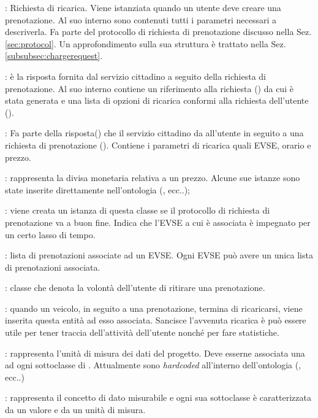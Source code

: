 \begin{description}
	\item {}: Richiesta di ricarica. Viene istanziata quando un utente deve creare una prenotazione. Al suo interno sono contenuti tutti i parametri necessari a descriverla. Fa parte del protocollo di richiesta di prenotazione discusso nella Sez. \ref{sec:protocol}. Un approfondimento sulla sua struttura è trattato nella Sez. \ref{subsubsec:chargerequest}.
	\item {}: è la risposta fornita dal servizio cittadino a seguito della richiesta di prenotazione. Al suo interno contiene un riferimento alla richiesta () da cui è stata generata e una lista di opzioni di ricarica conformi alla richiesta dell'utente ().
	\item {}: Fa parte della risposta() che il servizio cittadino da all'utente in seguito a una richiesta di prenotazione (). Contiene i parametri di ricarica quali EVSE, orario e prezzo. 
	\item {}: rappresenta la divisa monetaria relativa a un prezzo. Alcune sue istanze sono state inserite direttamente nell'ontologia (,  ecc..);
	\item {}: viene creata un istanza di questa classe se il protocollo di richiesta di prenotazione va a buon fine. Indica che l'EVSE a cui è associata è impegnato per un certo lasso di tempo. 
	\item {}: lista di prenotazioni associate ad un EVSE. Ogni EVSE può avere un unica lista di prenotazioni associata.
	\item {}: classe che denota la volontà dell'utente di ritirare una prenotazione.
	\item {}: quando un veicolo, in seguito a una prenotazione, termina di ricaricarsi, viene inserita questa entità ad esso associata. Sancisce l'avvenuta ricarica è può essere utile per tener traccia dell'attività dell'utente nonché per fare statistiche.
	\item {}: rappresenta l'unità di misura dei dati del progetto. Deve esserne associata una ad ogni sottoclasse di . Attualmente sono \emph{hardcoded} all'interno dell'ontologia (,\\  ecc..) 	
	\item {}: rappresenta il concetto di dato misurabile e ogni sua sottoclasse è caratterizzata da un valore e da un unità di misura.
\end{description}

